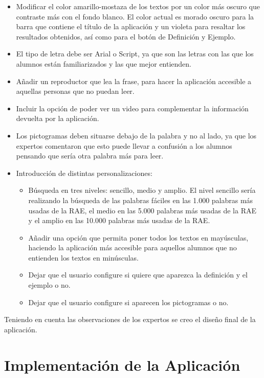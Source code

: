 \begin{itemize} 
	\item Modificar el color amarillo-mostaza de los textos por un color más oscuro que contraste más con el fondo blanco. El color actual es morado oscuro para la barra que contiene el título de la aplicación y un violeta para resaltar los resultados obtenidos, así como para el botón de Definición y Ejemplo.
	\item El tipo de letra debe ser Arial o Script, ya que son las letras con las que los alumnos están familiarizados y las que mejor entienden.
	\item Añadir un reproductor que lea la frase, para hacer la aplicación accesible a aquellas personas que no puedan leer.
	\item Incluir la opción de poder ver un video para complementar la información devuelta por la aplicación.
	\item Los pictogramas deben situarse debajo de la palabra y no al lado, ya que los expertos comentaron que esto puede llevar a confusión a los alumnos pensando que sería otra palabra más para leer. 
	\item Introducción de distintas personalizaciones:
	\begin{itemize}
		\item Búsqueda en tres niveles: sencillo, medio y amplio. El nivel sencillo sería realizando la búsqueda de las palabras fáciles en las 1.000 palabras más usadas de la RAE, el medio en las 5.000 palabras más usadas de la RAE y el amplio en las 10.000 palabras más usadas de la RAE. 
		\item Añadir una opción que permita poner todos los textos en mayúsculas, haciendo la aplicación más accesible para aquellos alumnos que no entienden los textos en minúsculas.
		\item Dejar que el usuario configure si quiere que aparezca la definición y el ejemplo o no.
		\item Dejar que el usuario configure  si aparecen los pictogramas o no.
	\end{itemize}
\end{itemize}

Teniendo en cuenta las observaciones de los expertos se creo el diseño final de la aplicación.





\section{Implementación de la Aplicación}
